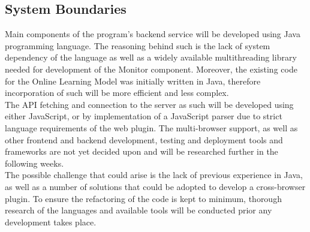 \documentclass[a4paper,11pt]{article}
\begin{document}
\subsection{System Boundaries}
\noindent Main components of the program’s backend service will be developed using Java programming language. The reasoning behind such is the lack of system dependency of the language as well as a widely available multithreading library needed for development of the Monitor component\cite{Java}. Moreover, the existing code for the Online Learning Model was initially written in Java, therefore incorporation of such will be more efficient and less complex.
\\
\indent The API fetching and connection to the server as such will be developed using either JavaScript, or by implementation of a JavaScript parser due to strict language requirements of the web plugin. The multi-browser support, as well as other frontend and backend development, testing and deployment tools and frameworks are not yet decided upon and will be researched further in the following weeks.
\\
\indent The possible challenge that could arise is the lack of previous experience in Java, as well as a number of solutions that could be adopted to develop a cross-browser plugin. To ensure the refactoring of the code is kept to minimum, thorough research of the languages and available tools will be conducted prior any development takes place.
\end{document}
